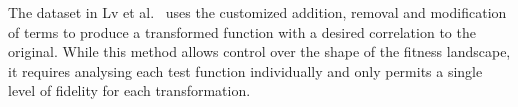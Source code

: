 
The dataset in Lv et al.~\cite{lv2021multi} uses the customized addition, removal and modification of terms to produce a transformed function with a desired correlation to the original.
While this method allows control over the shape of the fitness landscape, it requires analysing each test function individually and only permits a single level of fidelity for each transformation.

